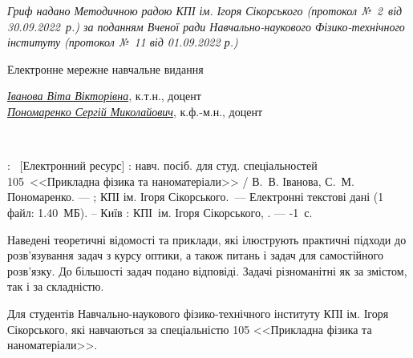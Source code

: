 {\begin{alwayssingle}
		\begin{center}\itshape\small
				Гриф надано Методичною радою КПІ ім. Ігоря Сікорського (протокол №~2~від 30.09.2022~р.) за поданням Вченої ради Навчально-наукового Фізико-технічного інституту (протокол №~11 від 01.09.2022 р.)
		\end{center}
		\begin{center}
			\ifelectronic Електронне мережне навчальне видання \fi
		\end{center}
		\begin{center}
			\href{https://apd.ipt.kpi.ua/blog/author/11}{\itshape Іванова Віта Вікторівна}, к.т.н., доцент \\
			\href{https://apd.ipt.kpi.ua/blog/author/183}{\itshape Пономаренко Сергій Миколайович}, к.ф.-м.н., доцент
		\end{center}
		\begin{center}\bfseries
			\LARGE\sffamily\realtitle \\
			\Large\sffamily\subtitletypeset
		\end{center}
        \begin{center}
            \editiontypeset
        \end{center}
        \noindent%
        \begin{minipage}[t]{\textwidth}\small
                \realtitle: \subtitletypeset\ [Електронний ресурс] : навч. посіб. для студ. спеціальностей
                105 <<Прикладна фізика та наноматеріали>> /  В.~В. Іванова, С.~М. Пономаренко. --- \editiontypeset ; КПІ ім. Ігоря Сікорського.~--- Електронні текстові дані
            (1 файл: 1.40~МБ). – Київ : КПІ ім. Ігоря Сікорського, \the\year. --- \the\numexpr{}-1\relax~с.
        \end{minipage}


		\vfill


        Наведені теоретичні відомості та приклади, які ілюструють практичні підходи до розв'язування задач з курсу оптики, а також  питань і задач для самостійного розв’язку.  До більшості задач подано відповіді. Задачі різноманітні як за змістом, так і за складністю.

        Для студентів Навчально-наукового фізико-технічного інституту КПІ ім. Ігоря Сікорського, які навчаються за спеціальністю 105 <<Прикладна фізика та наноматеріали>>.


\end{alwayssingle}}
